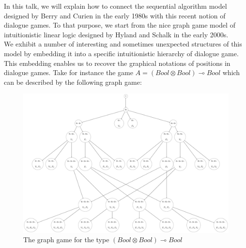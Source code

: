 \documentclass[11pt]{llncs} %
\begin{document}
In this talk, we will explain how to connect the sequential algorithm model designed
by Berry and Curien in the early 1980s with this recent notion of dialogue games.
To that purpose, we start from the nice graph game model of intuitionistic linear logic
designed by Hyland and Schalk in the early 2000s.\\  
We exhibit a number of interesting and sometimes unexpected structures of this model
by embedding it into a specific intuitionistic hierarchy of dialogue game.
This embedding enables us to recover the graphical notations of positions in dialogue games.
Take for instance the game $A=(Bool \otimes Bool) \multimap Bool$ which can be described by the following graph game:
\begin{figure}[H]\centering\includegraphics[scale=0.46]{bool-tens-bool-arrow-bool-graph.pdf}\caption{The graph game for the type $(Bool \otimes Bool) \multimap Bool$} \end{figure}
\end{document}
